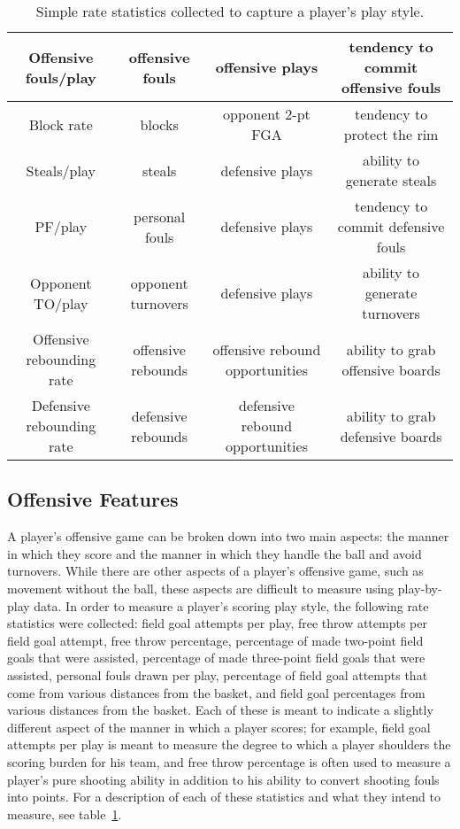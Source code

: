 \begin{table}
{\begin{tabular}{cccc}
        Offensive fouls/play & offensive fouls & offensive plays & tendency to
        commit offensive fouls \\
        \midrule
        Block rate & blocks & opponent 2-pt FGA & tendency to protect the rim \\
        Steals/play & steals & defensive plays & ability to generate steals \\
        PF/play & personal fouls & defensive plays & tendency to commit
        defensive fouls \\
        Opponent TO/play & opponent turnovers & defensive plays & ability to
        generate turnovers \\
        \midrule
        Offensive rebounding rate & offensive rebounds & offensive rebound
        opportunities & ability to grab offensive boards \\
        Defensive rebounding rate & defensive rebounds & defensive rebound
        opportunities & ability to grab defensive boards \\
        \bottomrule
    \end{tabular}
    }
    \caption{Simple rate statistics collected to capture a player's play style.}
    \label{tab:features}
\end{table}

\subsection{Offensive Features}

A player's offensive game can be broken down into two main aspects: the manner in
which they score and the manner in which they handle the ball and avoid turnovers.
While there are other aspects of a player's offensive game, such as movement without
the ball, these aspects are difficult to measure using play-by-play data. In order
to measure a player's scoring play style, the following rate statistics were
collected: field goal attempts per play, free throw attempts per field goal attempt,
free throw percentage, percentage of made two-point field goals that were assisted,
percentage of made three-point field goals that were assisted, personal fouls drawn
per play, percentage of field goal attempts that come from various distances from
the basket, and field goal percentages from various distances from the basket. Each
of these is meant to indicate a slightly different aspect of the manner in which a
player scores; for example, field goal attempts per play is meant to measure the
degree to which a player shoulders the scoring burden for his team, and free throw
percentage is often used to measure a player's pure shooting ability in addition to
his ability to convert shooting fouls into points. For a description of each of
these statistics and what they intend to measure, see table~\ref{tab:features}.

